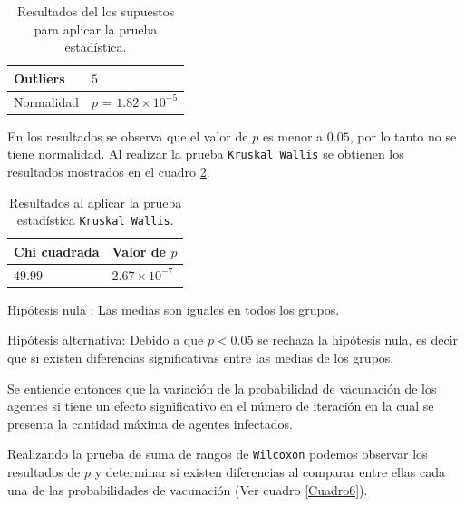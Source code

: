 \documentclass{article}
\begin{document}
\begin{table}[ht]
\centering
\caption{Resultados del los supuestos para aplicar la prueba estadística.}
\smallskip

\begin{tabular}{ |p{2.1cm}|p{3cm}|}
 \hline
 Outliers & $5$ \\
 \hline
 Normalidad & $p$ = $1.82\times 10^{-5}$ \\
 \hline
\end{tabular}
\label{Cuadro4}
\end{table}

En los resultados se observa que el valor de $p$ es menor a $0.05$, por lo tanto no se tiene normalidad. Al realizar la prueba \texttt{Kruskal Wallis} se obtienen los resultados mostrados en el cuadro \ref{Cuadro5}.

\begin{table}[ht]
\centering
\caption{Resultados al aplicar la prueba estadística \texttt{Kruskal Wallis}.}
\smallskip

\begin{tabular}{ |p{2.1cm}|p{2.1cm}|}
 \hline
 Chi cuadrada & Valor de $p$ \\
 \hline
 $49.99$ & $2.67\times 10^{-7}$ \\
 \hline
\end{tabular}
\label{Cuadro5}
\end{table}

Hipótesis nula : Las medias son iguales en todos los grupos.
\smallskip

Hipótesis alternativa: Debido a que $p < 0.05$ se rechaza la hipótesis nula, es decir que si existen diferencias significativas entre las medias de los grupos. 
\smallskip

Se entiende entonces que la variación de la probabilidad de vacunación de los agentes si tiene un efecto significativo en el número de iteración en la cual se presenta la cantidad máxima de agentes infectados.
\bigskip

Realizando la prueba de suma de rangos de \texttt{Wilcoxon} podemos observar los resultados de $p$ y determinar si existen diferencias al comparar entre ellas cada una de las probabilidades de vacunación (Ver cuadro \ref{Cuadro6}).
\end{document}
